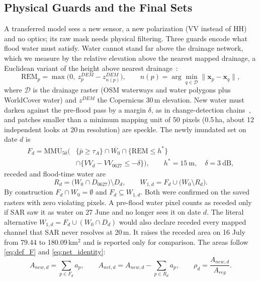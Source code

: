 \subsection{Physical Guards and the Final Sets}

A transferred model sees a new sensor, a new polarization (VV instead of HH) and no optics; its raw mask needs physical filtering. Three guards encode what flood water must satisfy. Water cannot stand far above the drainage network, which we measure by the relative elevation above the nearest mapped drainage, a Euclidean variant of the height above nearest drainage~\cite{nobre2011hand}:
\begin{equation}
\mathrm{REM}_p=\max\big(0,\ z^{DEM}_p-z^{DEM}_{n(p)}\big),\qquad n(p)=\arg\min_{q\in\mathcal D}\lVert \boldsymbol x_p-\boldsymbol x_q\rVert,
\label{eq:rem}
\end{equation}
where $\mathcal D$ is the drainage raster (OSM waterways and water polygons plus WorldCover water) and $z^{DEM}$ the Copernicus 30\,m elevation. New water must darken against the pre-flood pass by a margin $\delta$, as in change-detection chains~\cite{twele2016sentinel1}, and patches smaller than a minimum mapping unit of 50 pixels (0.5\,ha, about 12 independent looks at 20\,m resolution) are speckle. The newly inundated set on date $d$ is
\begin{equation}
\begin{split}
F_d=\mathrm{MMU}_{50}\Big(&\{\bar p\ge\tau_A\}\cap\overline{W_0}\cap\{\mathrm{REM}\le h^*\}\\
&\cap\{VV_d-VV_{0627}\le-\delta\}\Big),\qquad h^*=15\ \mathrm{m},\quad \delta=3\ \mathrm{dB},
\end{split}
\label{eq:F_hz}
\end{equation}
receded and flood-time water are
\begin{equation}
R_d=\big(W_0\cap D_{0627}\big)\setminus D_d,\qquad W_{1,d}=F_d\cup\big(W_0\setminus R_d\big).
\label{eq:W1_R}
\end{equation}
By construction $F_d\cap W_0=\emptyset$ and $F_d\subseteq W_{1,d}$. Both were confirmed on the saved rasters with zero violating pixels. A pre-flood water pixel counts as receded only if SAR saw it as water on 27 June and no longer sees it on date $d$. The literal alternative $W_{1,d}=F_d\cup(W_0\cap D_d)$ would also declare receded every mapped channel that SAR never resolves at 20\,m. It raises the receded area on 16 July from 79.44 to 180.09\,km$^2$ and is reported only for comparison. The areas follow \eqref{eq:def_F} and \eqref{eq:net_identity}:
\begin{equation}
A_{new,d}=\sum_{p\in F_d}a_p,\qquad A_{net,d}=A_{new,d}-\sum_{p\in R_d}a_p,\qquad \rho_d=\frac{A_{new,d}}{A_{reg}} .
\label{eq:areas_hz}
\end{equation}


